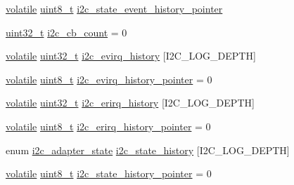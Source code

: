 \begin{DoxyCompactItemize}
\item 
\hyperlink{group___c_m_s_i_s___core___instruction_interface_gad7d93af13046b0378601b85c8c16673b}{volatile} \hyperlink{stdint_8h_aba7bc1797add20fe3efdf37ced1182c5}{uint8\-\_\-t} \hyperlink{group___p_i_o_s___i2_c_gabdb9d9357371d1ece20779da0d69d27b}{i2c\-\_\-state\-\_\-event\-\_\-history\-\_\-pointer}
\item 
\hyperlink{stdint_8h_a435d1572bf3f880d55459d9805097f62}{uint32\-\_\-t} \hyperlink{group___p_i_o_s___i2_c_gadd232b764b6676824e5a173a7b78f9fd}{i2c\-\_\-cb\-\_\-count} = 0
\item 
\hyperlink{group___c_m_s_i_s___core___instruction_interface_gad7d93af13046b0378601b85c8c16673b}{volatile} \hyperlink{stdint_8h_a435d1572bf3f880d55459d9805097f62}{uint32\-\_\-t} \hyperlink{group___p_i_o_s___i2_c_ga958ee525a13dda424039275af66ad3ce}{i2c\-\_\-evirq\-\_\-history} \mbox{[}I2\-C\-\_\-\-L\-O\-G\-\_\-\-D\-E\-P\-T\-H\mbox{]}
\item 
\hyperlink{group___c_m_s_i_s___core___instruction_interface_gad7d93af13046b0378601b85c8c16673b}{volatile} \hyperlink{stdint_8h_aba7bc1797add20fe3efdf37ced1182c5}{uint8\-\_\-t} \hyperlink{group___p_i_o_s___i2_c_gadf5676851d3bae320be666713dd5cb95}{i2c\-\_\-evirq\-\_\-history\-\_\-pointer} = 0
\item 
\hyperlink{group___c_m_s_i_s___core___instruction_interface_gad7d93af13046b0378601b85c8c16673b}{volatile} \hyperlink{stdint_8h_a435d1572bf3f880d55459d9805097f62}{uint32\-\_\-t} \hyperlink{group___p_i_o_s___i2_c_ga682906503c30ce6f539ac8f7628346f8}{i2c\-\_\-erirq\-\_\-history} \mbox{[}I2\-C\-\_\-\-L\-O\-G\-\_\-\-D\-E\-P\-T\-H\mbox{]}
\item 
\hyperlink{group___c_m_s_i_s___core___instruction_interface_gad7d93af13046b0378601b85c8c16673b}{volatile} \hyperlink{stdint_8h_aba7bc1797add20fe3efdf37ced1182c5}{uint8\-\_\-t} \hyperlink{group___p_i_o_s___i2_c_ga0593115613cf2d368fe6dbe7b4e5dcff}{i2c\-\_\-erirq\-\_\-history\-\_\-pointer} = 0
\item 
enum \hyperlink{pios__i2c__priv_8h_ac73b69ffe53544057fa2e4751fd9c22b}{i2c\-\_\-adapter\-\_\-state} \hyperlink{group___p_i_o_s___i2_c_ga207839e0ce4c1011c30ea9254657251c}{i2c\-\_\-state\-\_\-history} \mbox{[}I2\-C\-\_\-\-L\-O\-G\-\_\-\-D\-E\-P\-T\-H\mbox{]}
\item 
\hyperlink{group___c_m_s_i_s___core___instruction_interface_gad7d93af13046b0378601b85c8c16673b}{volatile} \hyperlink{stdint_8h_aba7bc1797add20fe3efdf37ced1182c5}{uint8\-\_\-t} \hyperlink{group___p_i_o_s___i2_c_gad02d69a4953e925d905e000697a0d885}{i2c\-\_\-state\-\_\-history\-\_\-pointer} = 0

\end{DoxyCompactItemize}
